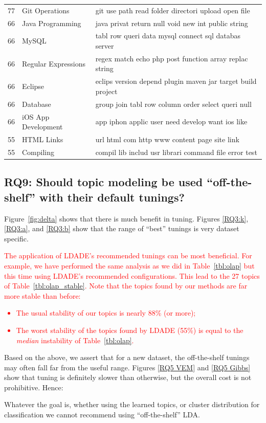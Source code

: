 \documentclass[twocolumn,5p,sort&compress]{elsarticle}
\newcommand{\bi}{\begin{itemize}}
\newcommand{\ei}{\end{itemize}}
\theoremstyle{break}
\begin{document}
\begin{table}[!t]
\begin{center}
\begin{tabular}{r|l|l}
77 &Git Operations & git use path read folder directori upload open file \\
66 &Java Programming & java privat return null void new  int public string\\
66 &MySQL & tabl row queri data mysql connect sql databas server\\
66 &Regular Expressions & regex match echo php post function array replac string\\
66 &Eclipse & eclips version depend plugin maven jar target build  project\\
66 &Database & group join tabl row column order select  queri null\\
66 &iOS App Development & app iphon applic user need  develop want ios like\\
55 &HTML Links & url html com http www content page site  link\\
55 & Compiling & compil lib includ usr librari  command file error test\\
\end{tabular}
\end{center}
\end{table}
\subsection{\textbf{RQ9: Should topic modeling be used ``off-the-shelf'' with their default tunings?}}
\label{sect:rq9}

  Figure~\ref{fig:delta} shows that there is much benefit in tuning.
  Figures \ref{RQ3:k}, \ref{RQ3:a}, and \ref{RQ3:b} show that
  the range of ``best'' tunings is very dataset specific. 
  \textcolor{red}{The
  application of LDADE's recommended tunings can be most beneficial. For example,
  we have performed the same analysis as we did in Table~\ref{tbl:olap} but this time
  using LDADE's recommended
  configurations.
  This lead to the 27   topics of Table~\ref{tbl:olap_stable}. Note that
  the topics
  found by our methods are far more stable
  than before:
  \bi
  \item The usual stability of our topics is nearly 88\% (or more);
  \item
  The worst  stability of the topics
  found by LDADE (55\%) is equal to the {\em
  median} instability of
  Table~\ref{tbl:olap}.
  \ei}
    Based on the above, we assert that
  for a new dataset,
  the off-the-shelf tunings
  may often fall far from the useful range.
  Figures \ref{RQ5 VEM} and \ref{RQ5 Gibbs} show that tuning is definitely
  slower than otherwise, but the overall cost is not prohibitive.
  Hence:
  \begin{lesson}
    Whatever the goal is, whether using the learned topics, or cluster distribution for classification
    we cannot recommend using ``off-the-shelf'' LDA.
  \end{lesson}
\end{document}
